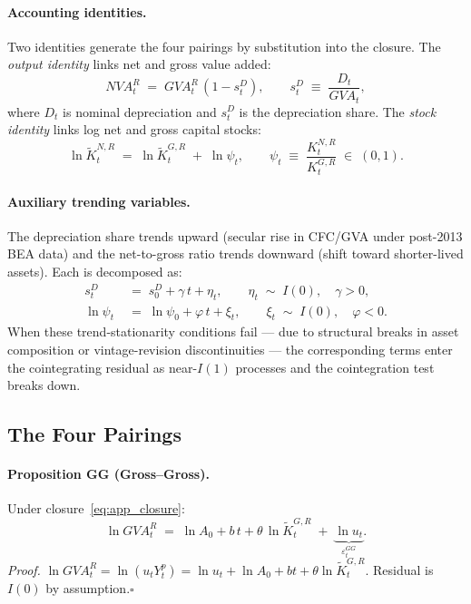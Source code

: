 \paragraph{Accounting identities.}
Two identities generate the four pairings by substitution into the
closure. The \emph{output identity} links net and gross value added:
%
\begin{equation}
  \label{eq:app_output_id}
  NVA_t^R \;=\; GVA_t^R\,(1 - s_t^D),
  \qquad
  s_t^D \;\equiv\; \frac{D_t}{GVA_t},
\end{equation}
%
where $D_t$ is nominal depreciation and $s_t^D$ is the depreciation share.
The \emph{stock identity} links log net and gross capital stocks:
%
\begin{equation}
  \label{eq:app_stock_id}
  \ln\tilde{K}_t^{N,R} \;=\; \ln\tilde{K}_t^{G,R} \;+\; \ln\psi_t,
  \qquad
  \psi_t \;\equiv\; \frac{K_t^{N,R}}{K_t^{G,R}} \;\in\; (0,1).
\end{equation}

\paragraph{Auxiliary trending variables.}
The depreciation share trends upward (secular rise in CFC/GVA under
post-2013 BEA data) and the net-to-gross ratio trends downward (shift
toward shorter-lived assets). Each is decomposed as:
%
\begin{align}
  s_t^D &\;=\; s_0^D + \gamma\,t + \eta_t,
  \qquad \eta_t \;\sim\; I(0),\quad \gamma > 0,
  \label{eq:app_sd_trend} \\
  \ln\psi_t &\;=\; \ln\psi_0 + \varphi\,t + \xi_t,
  \qquad \xi_t \;\sim\; I(0),\quad \varphi < 0.
  \label{eq:app_psi_trend}
\end{align}
%
When these trend-stationarity conditions fail --- due to structural breaks
in asset composition or vintage-revision discontinuities --- the
corresponding terms enter the cointegrating residual as near-$I(1)$
processes and the cointegration test breaks down.


\subsection{The Four Pairings}
\label{app:fp_propositions}

\paragraph{Proposition GG (Gross--Gross).}
Under closure~\eqref{eq:app_closure}:
%
\begin{equation}
  \label{eq:app_GG}
  \ln GVA_t^R
  \;=\; \ln A_0 + b\,t + \theta\,\ln\tilde{K}_t^{G,R}
  \;+\; \underbrace{\ln u_t}_{\varepsilon_t^{GG}}.
\end{equation}
%
\emph{Proof.} $\ln GVA_t^R = \ln(u_t Y_t^p) = \ln u_t + \ln A_0 + bt +
\theta\ln\tilde{K}_t^{G,R}$.
Residual is $I(0)$ by assumption.\hfill$\square$

